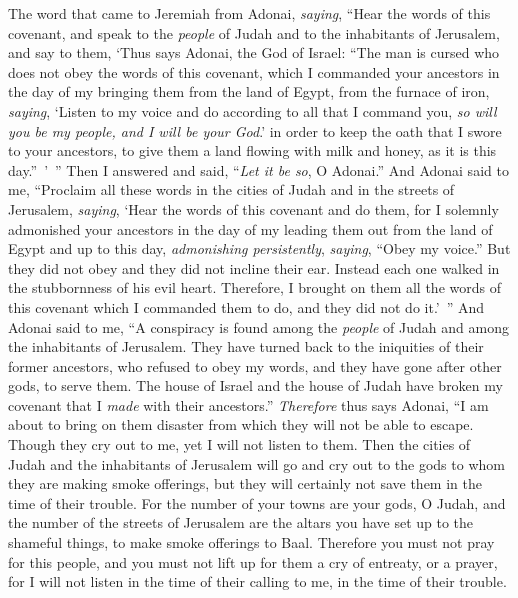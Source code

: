 \begin{biblechapter} %
 The word that came to Jeremiah from Adonai, \textit{saying},
\verse “Hear the words of this covenant, and speak to the \textit{people} of Judah and to the inhabitants of Jerusalem,
\verse and say to them, ‘Thus says Adonai, the God of Israel: “The man is cursed who does not obey the words of this covenant,
\verse which I commanded your ancestors in the day of my bringing them from the land of Egypt, from the furnace of iron, \textit{saying}, ‘Listen to my voice and do according to all that I command you, \textit{so will you be my people, and I will be your God}.’
\verse in order to keep the oath that I swore to your ancestors, to give them a land flowing with milk and honey, as it is this day.” ’ ” Then I answered and said, “\textit{Let it be so}, O Adonai.”
\verse And Adonai said to me, “Proclaim all these words in the cities of Judah and in the streets of Jerusalem, \textit{saying}, ‘Hear the words of this covenant and do them,
\verse for I solemnly admonished your ancestors in the day of my leading them out from the land of Egypt and up to this day, \textit{admonishing persistently}, \textit{saying}, “Obey my voice.”
\verse But they did not obey and they did not incline their ear. Instead each one walked in the stubbornness of his evil heart. Therefore, I brought on them all the words of this covenant which I commanded them to do, and they did not do it.’ ”
\verse And Adonai said to me, “A conspiracy is found among the \textit{people} of Judah and among the inhabitants of Jerusalem.
\verse They have turned back to the iniquities of their former ancestors, who refused to obey my words, and they have gone after other gods, to serve them. The house of Israel and the house of Judah have broken my covenant that I \textit{made} with their ancestors.”
\verse \textit{Therefore} thus says Adonai, “I am about to bring on them disaster from which they will not be able to escape. Though they cry out to me, yet I will not listen to them.
\verse Then the cities of Judah and the inhabitants of Jerusalem will go and cry out to the gods to whom they are making smoke offerings, but they will certainly not save them in the time of their trouble.
\verse For the number of your towns are your gods, O Judah, and the number of the streets of Jerusalem are the altars you have set up to the shameful things, to make smoke offerings to Baal.
\verse Therefore you must not pray for this people, and you must not lift up for them a cry of entreaty, or a prayer, for I will not listen in the time of their calling to me, in the time of their trouble.

\end{biblechapter}

